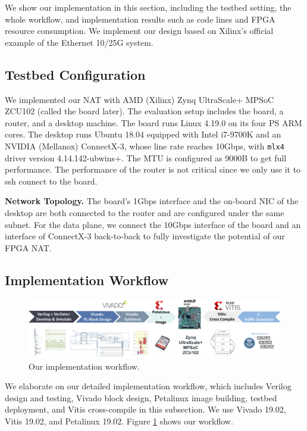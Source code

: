 
We show our implementation in this section, including the testbed setting, the whole workflow, and implementation results such as code lines and FPGA resource consumption. We implement our design based on Xilinx's official example of the Ethernet 10/25G system.
\subsection{Testbed Configuration}
We implemented our NAT with AMD (Xilinx) Zynq UltraScale+ MPSoC ZCU102 (called the board later). The evaluation setup includes the board, a router, and a desktop machine.
The board runs Linux 4.19.0 on its four PS ARM cores. 
The desktop runs Ubuntu 18.04 equipped with Intel i7-9700K and an NVIDIA (Mellanox) ConnectX-3, 
whose line rate reaches 10Gbps, with \verb|mlx4| driver version 4.14.142-ubwins+. The MTU is configured as 9000B to get full performance.
The performance of the router is not critical since we only use it to ssh connect to the board.





\textbf{Network Topology.} 
The board's 1Gbps interface and the on-board NIC of the desktop are both connected to the router and are configured under the same subnet. 
For the data plane, we connect the 10Gbps interface of the board and an interface of ConnectX-3 back-to-back to fully investigate the potential of our FPGA NAT.

\subsection{Implementation Workflow}


\begin{figure}[h]
    \centering
    \includegraphics[width=500pt]{images/implworkflow.pdf}
    \caption{Our implementation workflow. }
    \label{fig:workflow}
\end{figure}

We elaborate on our detailed implementation workflow, which includes Verilog design and testing, Vivado block design, Petalinux image building, testbed deployment, and Vitis cross-compile in this subsection. We use Vivado 19.02, Vitis 19.02, and Petalinux 19.02. Figure \ref{fig:workflow} shows our workflow.

